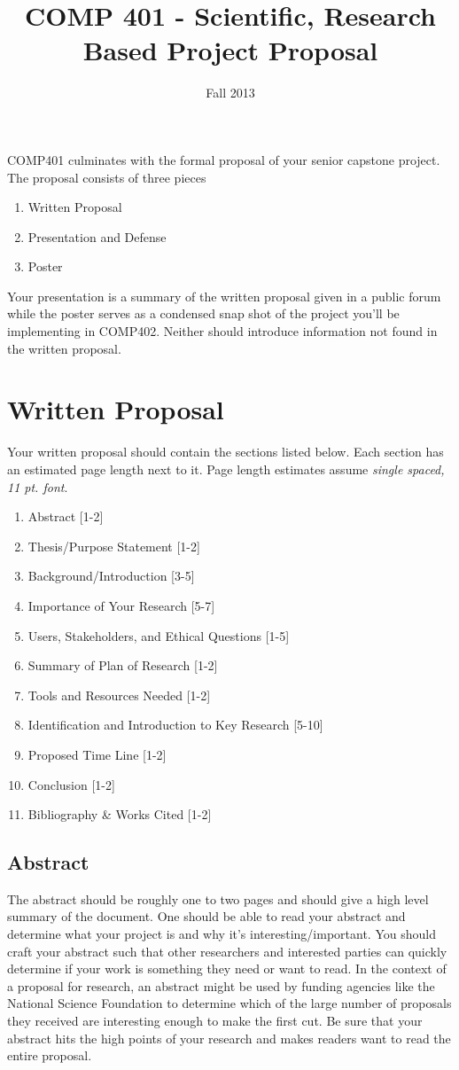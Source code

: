 \documentclass[10pt]{article}
\title{COMP 401 - Scientific, Research Based Project Proposal}
\author{  }
\date{Fall 2013}
\begin{document}
\maketitle

COMP401 culminates with the formal proposal of your senior capstone project.  The proposal consists of three pieces
\begin{enumerate}
\item Written Proposal
\item Presentation and Defense 
\item Poster
\end{enumerate}
Your presentation is a summary of the written proposal given in a public forum while the poster serves as a condensed snap shot of the project you'll be implementing in COMP402.  Neither should introduce information not found in the written proposal.

\section{Written Proposal}

Your written proposal should contain the sections listed below.  Each section has an estimated page length next to it.  Page length estimates assume \textit{single spaced, 11 pt. font}.   
\begin{enumerate}
\item Abstract [1-2]
\item Thesis/Purpose Statement [1-2]
\item Background/Introduction [3-5]
\item Importance of Your Research [5-7]
\item Users, Stakeholders, and Ethical Questions [1-5]
\item Summary of Plan of Research [1-2]
\item Tools and Resources Needed [1-2]
\item Identification and Introduction to Key Research [5-10]
\item Proposed Time Line [1-2]
\item Conclusion [1-2]
\item Bibliography \& Works Cited [1-2]
\end{enumerate}

\subsection{Abstract}
The abstract should be roughly one to two pages and should give a high level summary of the document.  One should be able to read your abstract and determine what your project is and why it's interesting/important.  You should craft your abstract such that other researchers and interested parties can quickly determine if your work is something they need or want to read.  In the context of a proposal for research, an abstract might be used by funding agencies like the National Science Foundation to determine which of the large number of proposals they received are interesting enough to make the first cut.  Be sure that your abstract hits the high points of your research and makes readers want to read the entire proposal.
\end{document}
